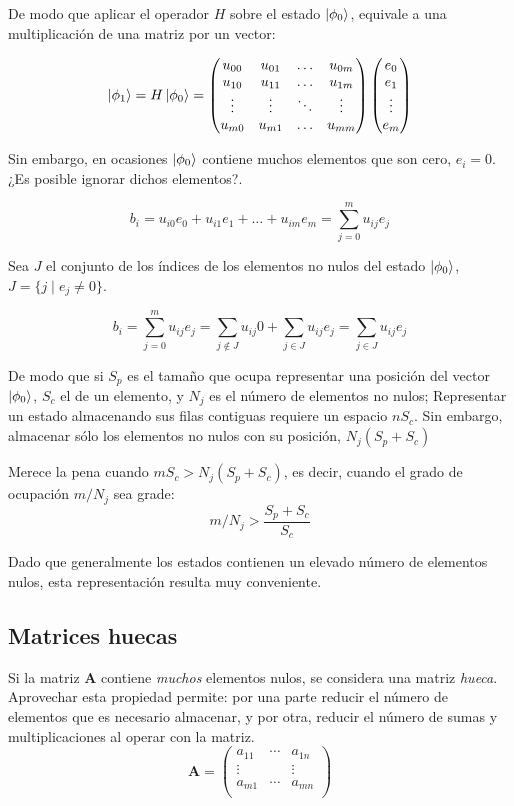\documentclass{article}
\newcommand*\mat[1]{ \begin{pmatrix} #1 \end{pmatrix}}
\theoremstyle{definition}
\begin{document}
De modo que aplicar el operador $H$ sobre el estado $\ket{\phi_0}$, equivale a 
una multiplicación de una matriz por un vector:

$$ \ket{\phi_1} =
	H \ket{\phi_0} = \mat{ u_{00} & u_{01} & \ldots & u_{0m} \\
		u_{10} & u_{11} & \ldots & u_{1m}\\
		\vdots & \vdots & \ddots & \vdots \\
		u_{m0} & u_{m1} & \ldots & u_{mm}\\
	}
	\mat{e_0 \\ e_1 \\ \vdots \\ e_m}
$$

Sin embargo, en ocasiones $\ket{\phi_0}$ contiene muchos elementos que son cero, 
$e_i = 0$. ¿Es posible ignorar dichos elementos?.

$$ b_i = u_{i0} e_0 + u_{i1} e_1 + \ldots + u_{im} e_m =
	\sum_{j = 0}^{m} u_{ij} e_j
$$

Sea $J$ el conjunto de los índices de los elementos no nulos del estado 
$\ket{\phi_0}$, $ J = \{j \mid e_j \neq 0\} $.

$$ b_i = \sum_{j = 0}^{m} u_{ij} e_j =
	\sum_{j \notin J} u_{ij} 0 + \sum_{j \in J} u_{ij} e_j =
	\sum_{j \in J} u_{ij} e_j
$$

De modo que si $S_p$ es el tamaño que ocupa representar una posición del vector 
$\ket{\phi_0}$, $S_c$ el de un elemento, y $N_j$ es el número de elementos no 
nulos; Representar un estado almacenando sus filas contiguas requiere un espacio 
$nS_c$. Sin embargo, almacenar sólo los elementos no nulos con su posición, 
$N_j(S_p + S_c)$

Merece la pena cuando $mS_c > N_j(S_p + S_c)$, es decir, cuando el grado de 
ocupación $m/N_j$ sea grade:
$$m/N_j > \frac{S_p + S_c}{S_c}$$

Dado que generalmente los estados contienen un elevado número de elementos 
nulos, esta representación resulta muy conveniente.


\subsection{Matrices huecas}

Si la matriz \textbf{A} contiene \textit{muchos} elementos nulos, se considera 
una matriz \textit{hueca}. Aprovechar esta propiedad permite: por una parte 
reducir el número de elementos que es necesario almacenar, y por otra, reducir 
el número de sumas y multiplicaciones al operar con la matriz.
$$ \textbf{A} = \mat{ a_{11} & \cdots & a_{1n} \\
		\vdots &   & \vdots \\
		a_{m1} & \cdots & a_{mn}\\
	}
$$
\end{document}

